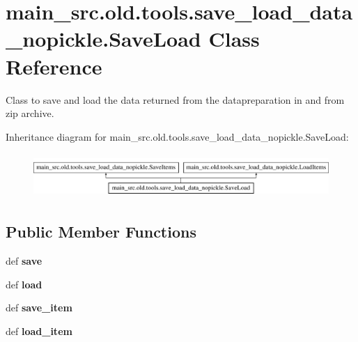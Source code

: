 \hypertarget{classmain__src_8old_1_1tools_1_1save__load__data__nopickle_1_1SaveLoad}{\section{main\-\_\-src.\-old.\-tools.\-save\-\_\-load\-\_\-data\-\_\-nopickle.\-Save\-Load Class Reference}
\label{classmain__src_8old_1_1tools_1_1save__load__data__nopickle_1_1SaveLoad}
}


Class to save and load the data returned from the datapreparation in and from zip archive.  


Inheritance diagram for main\-\_\-src.\-old.\-tools.\-save\-\_\-load\-\_\-data\-\_\-nopickle.\-Save\-Load\-:\begin{figure}[H]
\begin{center}
\leavevmode
\includegraphics[height=1.696970cm]{classmain__src_8old_1_1tools_1_1save__load__data__nopickle_1_1SaveLoad}
\end{center}
\end{figure}
\subsection*{Public Member Functions}
\begin{DoxyCompactItemize}
\item 
\hypertarget{classmain__src_8old_1_1tools_1_1save__load__data__nopickle_1_1SaveLoad_a18f863898eabb8b33a79893b93f15799}{def {\bfseries save}}\label{classmain__src_8old_1_1tools_1_1save__load__data__nopickle_1_1SaveLoad_a18f863898eabb8b33a79893b93f15799}

\item 
\hypertarget{classmain__src_8old_1_1tools_1_1save__load__data__nopickle_1_1SaveLoad_a7d53b39263a0aad2ae9d6acc98088cb6}{def {\bfseries load}}\label{classmain__src_8old_1_1tools_1_1save__load__data__nopickle_1_1SaveLoad_a7d53b39263a0aad2ae9d6acc98088cb6}

\item 
\hypertarget{classmain__src_8old_1_1tools_1_1save__load__data__nopickle_1_1SaveLoad_aa140648aea0a2ca8e79e19cbfeaa1ad6}{def {\bfseries save\-\_\-item}}\label{classmain__src_8old_1_1tools_1_1save__load__data__nopickle_1_1SaveLoad_aa140648aea0a2ca8e79e19cbfeaa1ad6}

\item 
\hypertarget{classmain__src_8old_1_1tools_1_1save__load__data__nopickle_1_1SaveLoad_a8161349504a218fb4bd7d66db0ac684a}{def {\bfseries load\-\_\-item}}\label{classmain__src_8old_1_1tools_1_1save__load__data__nopickle_1_1SaveLoad_a8161349504a218fb4bd7d66db0ac684a}

\end{DoxyCompactItemize}
